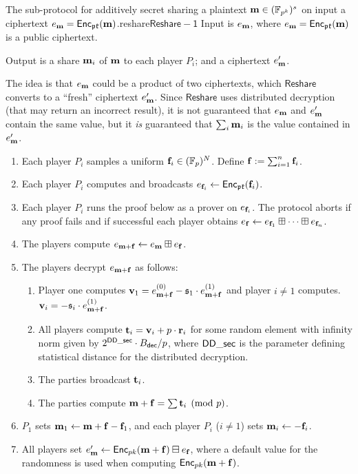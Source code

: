 \begin{Boxfig}{The sub-protocol for additively secret sharing a plaintext $\mathbf{m} \in ({\mathbb{F}}_{p^k})^s$ on input a ciphertext $e_{\mathbf{m}}=\mathsf{Enc}_{\mathfrak{pk}}(\mathbf{m})$.}{reshare}{$\mathsf{Reshare-1}$}
  Input is $e_{\mathbf{m}}$, where $e_{\mathbf{m}}=\mathsf{Enc}_{\mathfrak{pk}}(\mathbf{m})$ is a public ciphertext.

  Output is a share $\mathbf{m}_i$ of $\mathbf{m}$ to each player $P_i$; and a ciphertext $e'_{\mathbf{m}}$.

  The idea is that $e_{\mathbf{m}}$ could be a product of two ciphertexts, which
  $\mathsf{Reshare}$ converts to a ``fresh'' ciphertext $e'_{\mathbf{m}}$. Since $\mathsf{Reshare}$ uses distributed decryption (that may return an incorrect result), it is not guaranteed that $e_{\mathbf{m}}$ and $e'_{\mathbf{m}}$ contain the same value, but it
    {\em is} guaranteed that $\sum_i \mathbf{m}_i$ is the value contained in $e'_{\mathbf{m}}$.
  \begin{enumerate}
    \item Each player $P_i$ samples a uniform $\mathbf{f}_i\in ({\mathbb{F}}_p)^N$. Define $\mathbf{f}:=\sum_{i=1}^{n}\mathbf{f}_i$.
    \item Each player $P_i$ computes and broadcasts $e_{\mathbf{f}_i}\leftarrow\mathsf{Enc}_{\mathfrak{pk}}(\mathbf{f}_i)$.\label{reshare:enc}
    \item Each player $P_i$ runs the proof below as a prover on $e_{\mathbf{f}_i}$. The protocol aborts if any proof fails
          and if successful each player obtains $e_{\mathbf{f}}\leftarrow e_{\mathbf{f}_1}\boxplus\dots\boxplus e_{\mathbf{f}_n}$.
    \item The players compute $e_{\mathbf{m}+\mathbf{f}}\leftarrow e_{\mathbf{m}}\boxplus e_{\mathbf{f}}$.
    \item The players decrypt $e_{\mathbf{m}+\mathbf{f}}$ as follows:
          \begin{enumerate}
            \item Player one computes $\mathbf{v}_1 = e_{\mathbf{m}+\mathbf{f}}^{(0)}-\mathfrak{s}_1 \cdot e_{\mathbf{m}+\mathbf{f}}^{(1)}$ and player $i \ne 1$ computes.
                  $\mathbf{v}_i = -\mathfrak{s}_i \cdot e_{\mathbf{m}+\mathbf{f}}^{(1)}$.
            \item All players compute $\mathbf{t}_i = \mathbf{v}_i + p \cdot \mathbf{r}_i$ for some random element
                  with infinity norm given by $2^{\mathsf{DD\_sec}} \cdot B_{\mathsf{dec}}/p$, where $\mathsf{DD\_sec}$ is the parameter defining statistical distance for the distributed decryption.
            \item The parties broadcast $\mathbf{t}_i$.
            \item The parties compute $\mathbf{m}+\mathbf{f} = \sum \mathbf{t}_i \pmod{p}$.
          \end{enumerate}
    \item $P_1$ sets $\mathbf{m}_1\leftarrow \mathbf{m}+\mathbf{f}-\mathbf{f}_1$, and
          each player $P_i$ ($i\neq 1$) sets $\mathbf{m}_i\leftarrow -\mathbf{f}_i$.
    \item All players set $e'_{\mathbf{m}} \leftarrow \mathsf{Enc}_{pk}(\mathbf{m}+\mathbf{f})\boxminus e_{\mathbf{f}}$,
          where a default value for the randomness is used when computing $\mathsf{Enc}_{pk}(\mathbf{m}+\mathbf{f})$.
  \end{enumerate}
\end{Boxfig}


